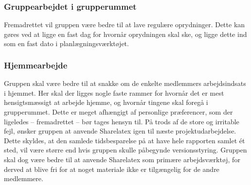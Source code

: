 \subsubsection{Gruppearbejdet i grupperummet} 
Fremadrettet vil gruppen være bedre til at lave regulære oprydninger. Dette kan gøres ved at ligge en fast dag for hvornår oprydningen skal ske, og ligge dette ind som en fast dato i planlægningsværktøjet. \\

\subsubsection{Hjemmearbejde} 
Gruppen skal være bedre til at snakke om de enkelte medlemmers arbejdsindsats i hjemmet. Her skal der ligges nogle faste rammer for hvornår det er mest hensigtsmæssigt at arbejde hjemme, og hvornår tingene skal foregå i grupperummet. Dette er meget afhængigt af personlige præferencer, som der ligeledes – fremadrettet – bør tages hensyn til. På trods af de store og irritable fejl, ønsker gruppen at anvende Sharelatex igen til næste projektudarbejdelse. Dette skyldes, at den samlede tidsbesparelse på at have hele rapporten samlet ét sted, vil være større end hvis gruppen skulle påbegynde versionsstyring. Gruppen skal dog være bedre til at anvende Sharelatex som primære arbejdsværktøj, for derved at blive fri for at noget materiale ikke er tilgængelig for de andre medlemmere.





